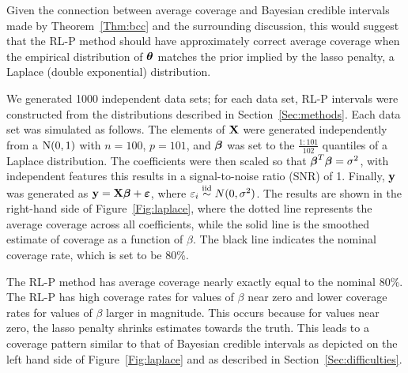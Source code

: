 Given the connection between average coverage and Bayesian credible intervals made by Theorem~\ref{Thm:bcc} and the surrounding discussion, this would suggest that the RL-P method should have approximately correct average coverage when the empirical distribution of $\boldsymbol{\theta}$ matches the prior implied by the lasso penalty, a Laplace (double exponential) distribution.

We generated 1000 independent data sets; for each data set, RL-P intervals were constructed from the distributions described in Section~\ref{Sec:methods}. Each data set was simulated as follows. The elements of $\mathbf{X}$ were generated independently from a $\textrm{N}(0, 1)$ with $n = 100$, $p = 101$, and $\boldsymbol{\beta}$ was set to the $\frac{1:101}{102}$ quantiles of a Laplace distribution. The coefficients were then scaled so that $\boldsymbol{\beta}^T\boldsymbol{\beta} = \sigma^2$, with independent features this results in a signal-to-noise ratio (SNR) of 1. Finally, $\mathbf{y}$ was generated as $\mathbf{y} = \mathbf{X}\boldsymbol{\beta} + \boldsymbol{\varepsilon}$, where $\varepsilon_i \overset{\text{iid}}{\sim} N(0, \sigma^2)$. The results are shown in the right-hand side of Figure~\ref{Fig:laplace}, where the dotted line represents the average coverage across all coefficients, while the solid line is the smoothed estimate of coverage as a function of $\beta$. The black line indicates the nominal coverage rate, which is set to be 80\%.



The RL-P method has average coverage nearly exactly equal to the nominal 80\%. The RL-P has high coverage rates for values of $\beta$ near zero and lower coverage rates for values of $\beta$ larger in magnitude. This occurs because for values near zero, the lasso penalty shrinks estimates towards the truth. This leads to a coverage pattern similar to that of Bayesian credible intervals as depicted on the left hand side of Figure~\ref{Fig:laplace} and as described in Section~\ref{Sec:difficulties}.

